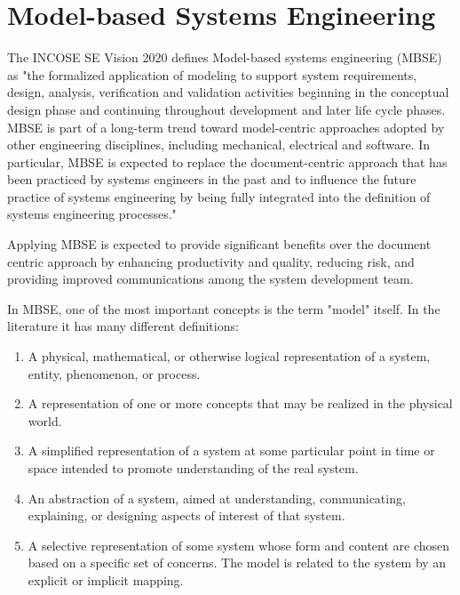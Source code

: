 \section{Model-based Systems Engineering}\label{sec:mbse}

The INCOSE SE Vision 2020\cite{incose-systems-engineering-2020} defines Model-based systems engineering (MBSE) as "the formalized application of modeling to support system requirements, design, analysis, verification and validation activities beginning in the conceptual design phase and continuing throughout development and later life cycle phases. MBSE is part of a long-term trend toward model-centric approaches adopted by other engineering disciplines, including mechanical, electrical and software. In particular, MBSE is expected to replace the document-centric approach that has been practiced by systems engineers in the past and to influence the future practice of systems engineering by being fully integrated into the definition of systems engineering processes."

Applying MBSE is expected to provide significant benefits over the document centric approach by enhancing productivity and quality, reducing risk, and providing improved communications among the system development team.\cite{omgwiki}

In MBSE, one of the most important concepts is the term "model" itself. In the literature it has many different definitions:

\begin{enumerate}
	\item A physical, mathematical, or otherwise logical representation of a system, entity, phenomenon, or process.\cite{DoD_modeling_and_simulation}\label{item:dod}
	\item A representation of one or more concepts that may be realized in the physical world.\cite{sysml_practical_guide}
	\item A simplified representation of a system at some particular point in time or space intended to promote understanding of the real system.\cite{modsim}
	\item An abstraction of a system, aimed at understanding, communicating, explaining, or designing aspects of interest of that system.\cite{object-process-methodology}
	\item A selective representation of some system whose form and content are chosen based on a specific set of concerns. The model is related to the system by an explicit or implicit mapping.\cite{ORMSC/2010-09-06}
\end{enumerate}

